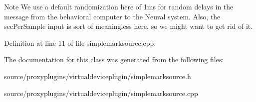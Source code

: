 \begin{DoxyNote}{Note}
We use a default randomization here of 1ms for random delays in the message from the behavioral computer to the Neural system. Also, the sec\-Per\-Sample input is sort of meaningless here, so we might want to get rid of it. 
\end{DoxyNote}


Definition at line 11 of file simplemarksource.\-cpp.



The documentation for this class was generated from the following files\-:\begin{DoxyCompactItemize}
\item 
source/proxyplugins/virtualdeviceplugin/simplemarksource.\-h\item 
source/proxyplugins/virtualdeviceplugin/simplemarksource.\-cpp\end{DoxyCompactItemize}
